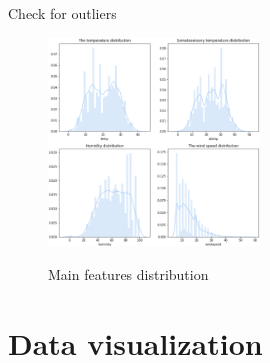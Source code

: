 \documentclass[
 size=14pt,
 paper=smartboard,  %
 mode=present, 		%
 display=slides, 	%
 style=tuliplab,  	%
 pauseslide,
 fleqn,leqno]{powerdot}
\begin{document}
\begin{slide}[toc=,bm=]{Check for outliers}

 
  
\vspace{-0.8cm}
\begin{figure}
\centering
{}
\includegraphics[width=0.5\textwidth]{figures//After_features_distribution_analysis.eps}\\
\caption{Main features distribution}\label{fig:OutAspect-target}
\end{figure}
        
\end{slide}
   
\section{Data visualization}
\end{document}
